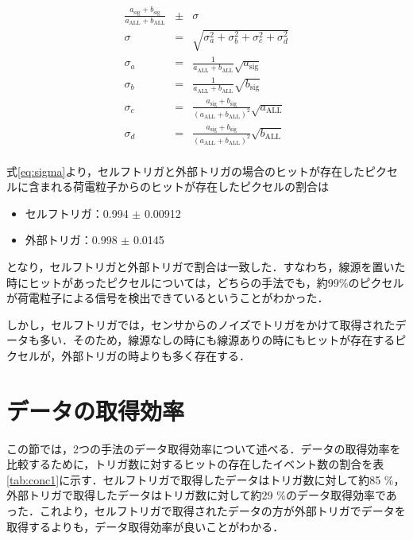 \begin{eqnarray}
  \label{eq:sigma}
  \frac{a_{\mathrm{sig}} + b_{\mathrm{sig}}}{a_{\mathrm{ALL}} + b_{\mathrm{ALL}}} &\pm& \sigma\\
  \sigma &=& \sqrt{\sigma_{a}^2 + \sigma_{b}^2 + \sigma_{c}^2 + \sigma_{d}^2} \\ \nonumber
  \sigma_a &=& \frac{1}{a_{\mathrm{ALL}} + b_{\mathrm{ALL}}} \sqrt{a_{\mathrm{sig}}}\\ \nonumber
  \sigma_b &=& \frac{1}{a_{\mathrm{ALL}} + b_{\mathrm{ALL}}} \sqrt{b_{\mathrm{sig}}}\\ \nonumber
  \sigma_c &=& \frac{a_{\mathrm{sig}} + b_{\mathrm{sig}}}{\left(a_{\mathrm{ALL}} + b_{\mathrm{ALL}}\right)^2}\sqrt{a_{\mathrm{ALL}}}\\ \nonumber
  \sigma_d &=& \frac{a_{\mathrm{sig}} + b_{\mathrm{sig}}}{\left(a_{\mathrm{ALL}} + b_{\mathrm{ALL}}\right)^2}\sqrt{b_{\mathrm{ALL}}}\\ \nonumber
\end{eqnarray}

式\ref{eq:sigma}より，セルフトリガと外部トリガの場合のヒットが存在したピクセルに含まれる荷電粒子からのヒットが存在したピクセルの割合は
\begin{itemize}
\item セルフトリガ：0.994 $\pm$ 0.00912 
\item 外部トリガ：0.998 $\pm$ 0.0145
\end{itemize}

となり，セルフトリガと外部トリガで割合は一致した．すなわち，線源を置いた時にヒットがあったピクセルについては，どちらの手法でも，約99\%のピクセルが荷電粒子による信号を検出できているということがわかった．\par
しかし，セルフトリガでは，センサからのノイズでトリガをかけて取得されたデータも多い．そのため，線源なしの時にも線源ありの時にもヒットが存在するピクセルが，外部トリガの時よりも多く存在する．


\section{データの取得効率}
この節では，2つの手法のデータ取得効率について述べる．データの取得効率を比較するために，トリガ数に対するヒットの存在したイベント数の割合を表\ref{tab:conc1}に示す．セルフトリガで取得したデータはトリガ数に対して約85 \%，外部トリガで取得したデータはトリガ数に対して約29 \%のデータ取得効率であった．これより，セルフトリガで取得されたデータの方が外部トリガでデータを取得するよりも，データ取得効率が良いことがわかる．

